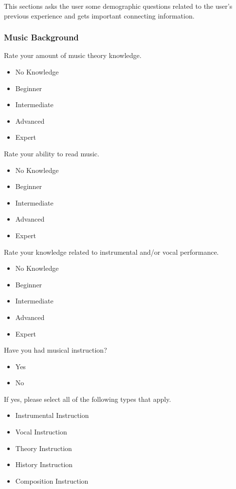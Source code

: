 This sections asks the user some demographic questions related to the user's previous experience and gets important connecting information.

\subsubsection{Music Background}
\label{subsubsec:musicbackground}

Rate your amount of music theory knowledge.

\begin{itemize}
	\item No Knowledge
	\item Beginner
	\item Intermediate
	\item Advanced
	\item Expert
\end{itemize}

\noindent Rate your ability to read music.

\begin{itemize}
	\item No Knowledge
	\item Beginner
	\item Intermediate
	\item Advanced
	\item Expert
\end{itemize}

\noindent Rate your knowledge related to instrumental and/or vocal performance.

\begin{itemize}
	\item No Knowledge
	\item Beginner
	\item Intermediate
	\item Advanced
	\item Expert
\end{itemize}

\noindent Have you had musical instruction?

\begin{itemize}
	\item Yes
	\item No
\end{itemize}

\noindent If yes, please select all of the following types that apply.

\begin{itemize}
	\item Instrumental Instruction
	\item Vocal Instruction
	\item Theory Instruction
	\item History Instruction
	\item Composition Instruction
\end{itemize}

